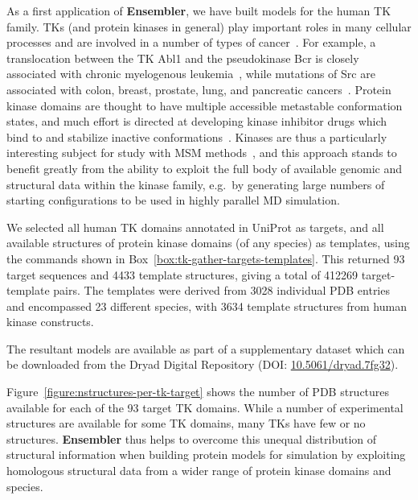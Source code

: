\documentclass[aps,prl,preprint,nofootinbib,superscriptaddress,linenumbers]{revtex4-1}
\begin{document}
As a first application of {\bf Ensembler}, we have built models for the human TK family.
TKs (and protein kinases in general) play important roles in many cellular processes and are involved in a number of types of cancer~\cite{krause:nejm:2005:tks-cancer}.
For example, a translocation between the TK Abl1 and the pseudokinase Bcr is closely associated with chronic myelogenous leukemia~\cite{greuber:2013:abl-cancer-review}, while mutations of Src are associated with colon, breast, prostate, lung, and pancreatic cancers~\cite{kim:2009:src-cancer-review}.
Protein kinase domains are thought to have multiple accessible metastable conformation states, and much effort is directed at developing kinase inhibitor drugs which bind to and stabilize inactive conformations~\cite{liu:ncb:2006:kinase-inhibitors-inactive-conformations}.
Kinases are thus a particularly interesting subject for study with MSM methods~\cite{shukla-pande:nature-commun:2014:src-activation-msm}, and this approach stands to benefit greatly from the ability to exploit the full body of available genomic and structural data within the kinase family, e.g.~by generating large numbers of starting configurations to be used in highly parallel MD simulation.

We selected all human TK domains annotated in UniProt as targets, and all available structures of protein kinase domains (of any species) as templates, using the commands shown in Box~\ref{box:tk-gather-targets-templates}.
This returned 93 target sequences and 4433 template structures, giving a total of \num{412269} target-template pairs.
The templates were derived from 3028 individual PDB entries and encompassed 23 different species, with 3634 template structures from human kinase constructs.

The resultant models are available as part of a supplementary dataset which can be downloaded from the Dryad Digital Repository (DOI: \href{http://datadryad.org/review?doi=doi:10.5061/dryad.7fg32}{10.5061/dryad.7fg32}).

Figure~\ref{figure:nstructures-per-tk-target} shows the number of PDB structures available for each of the 93 target TK domains.
While a number of experimental structures are available for some TK domains, many TKs have few or no structures. 
{\bf Ensembler} thus helps to overcome this unequal distribution of structural information when building protein models for simulation by exploiting homologous structural data from a wider range of protein kinase domains and species.

\begin{figure*}[tbp]
    \caption{{\bf Number of PDB structures available for each TK target.}
    Data is shown for each of the 93 TK kinase domains, sorted in order of the number of available PDB structures for each domain. 
    The labels indicate the UniProt name for the target protein plus an index for the kinase domain (three of the selected proteins have two kinase domains). 
    Each PDB chain is counted individually, and only chains which contain the target domain are counted.
    \label{figure:nstructures-per-tk-target}
}
\end{figure*}
\end{document}
